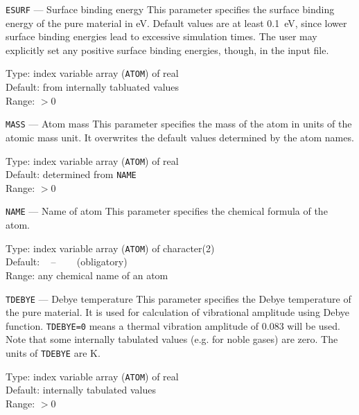 \begin{keydescription}{\texttt{ESURF} --- Surface binding energy}
%
  This parameter specifies the surface binding energy of the pure material in
  eV. Default values are at least 0.1~eV, since lower surface binding energies 
  lead to excessive simulation times. The user may explicitly set any 
  positive surface binding energies, though, in the input file.
  \begin{keytab}
    Type:    \> index variable array (\texttt{ATOM}) of real \\
    Default: \> from internally tabluated values \\
    Range:   \> $> 0$
  \end{keytab}
\end{keydescription}

\begin{keydescription}{\texttt{MASS} --- Atom mass}
%
  This parameter specifies the mass of the atom in units of the
  atomic mass unit.  It overwrites the default values determined by
  the atom names.
%
  \begin{keytab}
    Type:    \> index variable array (\texttt{ATOM}) of real \\
    Default: \> determined from \texttt{NAME} \\
    Range: \> $> 0$
  \end{keytab}
\end{keydescription}

\begin{keydescription}{\texttt{NAME} --- Name of atom}
%
  This parameter specifies the chemical formula of the atom.
%
  \begin{keytab}
    Type:    \> index variable array (\texttt{ATOM}) of character(2) \\
    Default: \> ~ -- ~~~ (obligatory) \\
    Range:   \> any chemical name of an atom
  \end{keytab}
\end{keydescription}

\begin{keydescription}{\texttt{TDEBYE} --- Debye temperature}
%
  This parameter specifies the Debye temperature of the pure material. It is used
  for calculation of vibrational amplitude using Debye function.  
  \texttt{TDEBYE=0} means a thermal vibration amplitude of 0.083 will be used. 
  Note that some internally tabulated values (e.g. for noble gases) are zero.
  The units of \texttt{TDEBYE} are K.
%
  \begin{keytab}
    Type:    \> index variable array (\texttt{ATOM}) of real \\
    Default: \> internally tabulated values \\
    Range:   \> $> 0$
  \end{keytab}
\end{keydescription}

